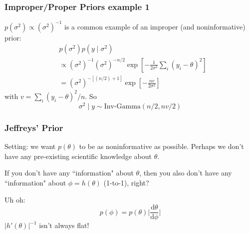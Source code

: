 \documentclass{beamer}
\begin{document}

\begin{frame}[fragile]
\frametitle{Improper/Proper Priors example 1}

$p(\sigma^2) \propto (\sigma^2)^{-1}$ is a common example of an improper (and noninformative) prior:
\begin{align*}
&p(\sigma^2)  p(y \mid \sigma^2)\\
&\propto (\sigma^2)^{-1} (\sigma^2)^{-n/2}\exp\left[-\frac{1}{2 \sigma^2} \sum_i \left(y_i - \theta \right)^2 \right] \\
&= (\sigma^2)^{-[(n/2)+1]}\exp\left[-\frac{nv}{2 \sigma^2} \right]
\end{align*}
with $v = \sum_i(y_i - \theta)^2 / n$. So
\[
\sigma^2 \mid y \sim \text{Inv-Gamma}(n/2, nv/2)
\]


\end{frame}


% 
% 
% 
% 


\begin{frame}[fragile]
\frametitle{Jeffreys' Prior}

Setting: we want $p(\theta)$ to be as noninformative as possible. Perhaps we don't have any pre-existing scientific knowledge about $\theta$. 
\newline

If you don't have any ``information" about $\theta$, then you also don't have any ``information" about $\phi = h(\theta)$ (1-to-1), right?
\newline
\pause

Uh oh:
\[
p(\phi) = p(\theta) \bigg\rvert \frac{\text{d}\theta}{\text{d}\phi } \bigg\rvert 
\]
$|h'(\theta)|^{-1}$ isn't always flat!

\end{frame}
\end{document}
